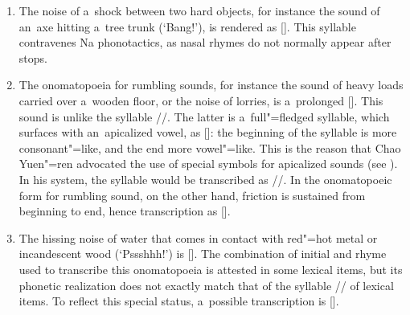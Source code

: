 			\begin{enumerate}[label=(\roman*)]
				\item The noise of a~shock between two hard objects, for instance the sound of an~axe hitting a~tree trunk (‘Bang!’), is rendered as []. This syllable contravenes Na phonotactics, as nasal rhymes do not normally appear after stops. 
				\item The onomatopoeia for rumbling sounds, for instance the sound of heavy loads carried over a~wooden floor, or the noise of lorries, is a~prolonged []. This sound is unlike the syllable //. The latter is a~full"=fledged syllable, which surfaces with an~apicalized vowel, as []: the beginning of the syllable is more consonant"=like, and the end more vowel"=like. This is the reason that Chao Yuen"=ren advocated the use of special symbols for apicalized sounds (see ). In his system, the syllable would be transcribed as //. In the onomatopoeic form for rumbling sound, on the other hand, friction is sustained from beginning to end, hence transcription as  [].
				\item The hissing noise of water that comes in contact with red"=hot metal or incandescent wood (‘Pssshhh!’) is []. The combination of initial and rhyme used to transcribe this onomatopoeia is attested in some lexical items, but its phonetic realization does not exactly match that of the syllable // of lexical items. To reflect this special status, a~possible transcription is [].
			\end{enumerate}
			

%			
			
